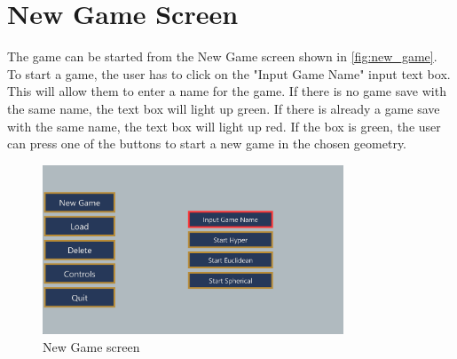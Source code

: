 \section{New Game Screen}
The game can be started from the New Game screen shown in \autoref{fig:new_game}.
To start a game, the user has to click on the "Input Game Name" input text box.
This will allow them to enter a name for the game.
If there is no game save with the same name, the text box will light up green.
If there is already a game save with the same name, the text box will light up red.
If the box is green, the user can press one of the buttons to start a new game in the chosen geometry.

\begin{figure}[!htb]
    \centering
    \includegraphics[width=0.8\textwidth]{chapters/user_manual/resources/new-game-no-input.png}
    \caption{New Game screen}
    \label{fig:new_game}
\end{figure}